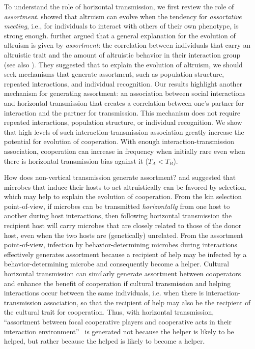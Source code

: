 \documentclass[12pt]{extarticle}
\begin{document}
To understand the role of horizontal transmission, we first review the role of \emph{assortment}.
\citet{Eshel1982} showed that altruism can evolve when the tendency for \emph{assortative meeting}, i.e., for individuals to interact with others of their own phenotype, is strong enough.
\citet{Fletcher2009assortment}  further argued that a general explanation for the evolution of altruism is given by \emph{assortment}: the correlation between individuals that carry an altruistic trait and the amount of altruistic behavior in their interaction group (see also \citet{Bijma2010assortment}).
They suggested that to explain the evolution of altruism, we should seek mechanisms that generate  assortment, such as population structure, repeated interactions, and individual recognition.
Our results highlight another mechanism for generating assortment: an association between social interactions and horizontal transmission that creates a correlation between one's partner for interaction and the partner for transmission.
This mechanism does not require repeated interactions, population structure, or individual recognition.
We show that high levels of such interaction-transmission association greatly increase the potential for evolution of cooperation.
With enough interaction-transmission association, cooperation can increase in frequency when initially rare even when there is horizontal transmission bias against it ($T_A<T_B$).

How does non-vertical transmission generate assortment? 
\citet{lewin2017microbes} and \citet{lewin2020rockpaperscissors} 
suggested that microbes that induce their hosts to act altruistically can be favored by selection, which may help to explain the evolution of cooperation. 
From the kin selection point-of-view, if microbes can be transmitted \emph{horizontally} from one host to another during host interactions, then following horizontal transmission the recipient host will carry microbes that are closely related to those of the donor host, 
even when the two hosts are (genetically) unrelated. 
From the assortment point-of-view,
infection by behavior-determining microbes during interactions effectively generates assortment because a recipient of help may be infected by a behavior-determining microbe and consequently become a helper.
Cultural horizontal transmission can similarly generate assortment between cooperators and enhance the benefit of cooperation if cultural transmission and helping interactions occur between the same individuals, i.e. when there is interaction-transmission association, so that the recipient of help may also be the recipient of the cultural trait for cooperation. 
Thus, with horizontal transmission, ``assortment between focal cooperative players and cooperative acts in their interaction
environment''~\citep{Fletcher2009assortment} is generated not because the helper is likely to be helped, but rather because the helped is likely to become a helper.
\end{document}
